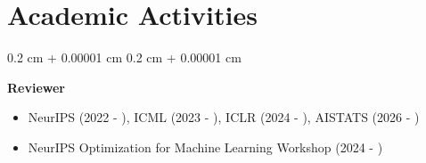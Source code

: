 \documentclass[10pt, letterpaper]{article}
\newenvironment{highlights}{
    \begin{itemize}[
        topsep=0.10 cm,
        parsep=0.10 cm,
        partopsep=0pt,
        itemsep=0pt,
        leftmargin=0.4 cm + 10pt
    ]
}{
    \end{itemize}
} %
\newenvironment{onecolentry}{
    \begin{adjustwidth}{
        0.2 cm + 0.00001 cm
    }{
        0.2 cm + 0.00001 cm
    }
}{
    \end{adjustwidth}
} %
\begin{document}
    \section{Academic Activities}

        \begin{onecolentry}
        \textbf{Reviewer}
            \begin{highlights}
                \item NeurIPS (2022 - ), ICML (2023 - ), ICLR (2024 - ), AISTATS (2026 - )
                \item NeurIPS Optimization for Machine Learning Workshop (2024 - )
            \end{highlights}
        \end{onecolentry}

    



        




    
\end{document}
